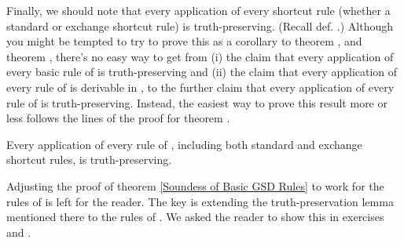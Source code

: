 \bigskip
\noindent{}Finally, we should note that every application of every shortcut rule (whether a standard or exchange shortcut rule) is truth-preserving. 
(Recall def. .) 
Although you might be tempted to try to prove this as a corollary to theorem , and theorem , there's no easy way to get from (i) the claim that every application of every basic rule of \GSD{} is truth-preserving and (ii) the claim that every application of every rule of \GSDP{} is derivable in \GSD{}, to the further claim that every application of every rule of \GSDP{} is truth-preserving. 
Instead, the easiest way to prove this result more or less follows the lines of the proof for theorem .
\begin{THEOREM}{}
Every application of every rule of \GSDP{}, including both standard and exchange shortcut rules, is truth-preserving.
\end{THEOREM}
\begin{PROOF}
Adjusting the proof of theorem \ref{Soundess of Basic GSD Rules} to work for the rules of \GSDP{} is left for the reader. 
The key is extending the truth-preservation lemma mentioned there to the rules of \GSDP{}.
We asked the reader to show this in exercises  and .
\end{PROOF}

